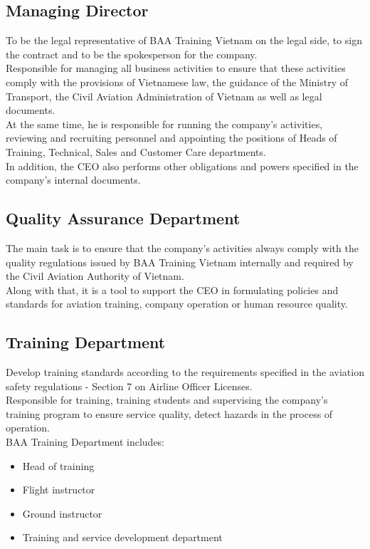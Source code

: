     \subsection{Managing Director}
        To be the legal representative of BAA Training Vietnam on the legal side, to sign the contract and to be the spokesperson for the company. \\ 
        \vspace{3mm}
        Responsible for managing all business activities to ensure that these activities comply with the provisions of Vietnamese law, the guidance 
        of the Ministry of Transport, the Civil Aviation Administration of Vietnam as well as legal documents. \\ 
        \vspace{3mm}
        At the same time, he is responsible for running the company's activities, reviewing and recruiting personnel and appointing the positions of 
        Heads of Training, Technical, Sales and Customer Care departments. \\ 
        \vspace{3mm}
        In addition, the CEO also performs other obligations and powers specified in the company's internal documents.
    \subsection{Quality Assurance Department}
        The main task is to ensure that the company's activities always comply with the quality regulations issued by BAA Training Vietnam internally 
        and required by the Civil Aviation Authority of Vietnam. \\ 
        \vspace{3mm}
        Along with that, it is a tool to support the CEO in formulating policies and standards for aviation training, company operation or human 
        resource quality.
    \subsection{Training Department}
        Develop training standards according to the requirements specified in the aviation safety regulations - Section 7 on Airline Officer Licenses. \\ 
        \vspace{3mm}
        Responsible for training, training students and supervising the company's training program to ensure service quality, detect hazards in the 
        process of operation. \\
        \vspace{3mm}
        BAA Training Department includes: 
        \begin{itemize}
            \item Head of training
            \item Flight instructor
            \item Ground instructor
            \item Training and service development department
        \end{itemize}
